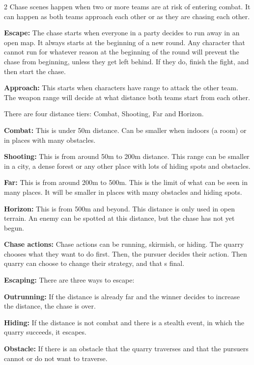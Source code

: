 \begin{multicols}{2}
Chase scenes happen when two or more teams are at risk of entering combat. It can happen as both teams approach each other or as they are chasing each other.

\textbf{Escape:} The chase starts when everyone in a party decides to run away in an open map. It always starts at the beginning of a new round. Any character that cannot run for whatever reason at the beginning of the round will prevent the chase from beginning, unless they get left behind. If they do, finish the fight, and then start the chase. 

\textbf{Approach:} This starts when characters have range to attack the other team. The weapon range will decide at what distance both teams start from each other.

There are four distance tiers: Combat, Shooting, Far and Horizon.

\begin{proplist}
    \item \textbf{Combat:} This is under 50m distance. Can be smaller when indoors (a room) or in places with many obstacles.
    \item \textbf{Shooting:} This is from around 50m to 200m distance. This range can be smaller in a city, a dense forest or any other place with lots of hiding spots and obstacles.
    \item \textbf{Far:} This is from around 200m to 500m. This is the limit of what can be seen in many places. It will be smaller in places with many obstacles and hiding spots.
    \item \textbf{Horizon:} This is from 500m and beyond. This distance is only used in open terrain. An enemy can be spotted at this distance, but the chase has not yet begun.
\end{proplist}

\textbf{Chase actions:} Chase actions can be running, skirmish, or hiding. The quarry chooses what they want to do first. Then, the pursuer decides their action. Then quarry can choose to change their strategy, and that s final.

\textbf{Escaping:} There are three ways to escape:

\begin{proplist}
    \item \textbf{Outrunning:} If the distance is already far and the winner decides to increase the distance, the chase is over.
    \item \textbf{Hiding:} If the distance is not combat and there is a stealth event, in which the quarry succeeds, it escapes.
    \item \textbf{Obstacle:} If there is an obstacle that the quarry traverses and that the pursuers cannot or do not want to traverse.
\end{proplist}


\end{multicols}
